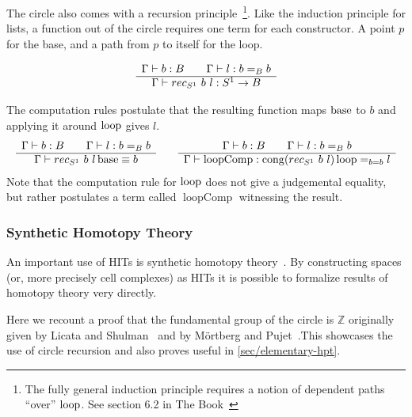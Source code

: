 The circle also comes with a recursion principle~\footnote{The fully general
  induction principle requires a notion of dependent paths ``over'' $\operatorname{loop}$. See section 6.2 in
  The Book~\cite{hottbook}}. Like the induction principle for lists,
a function out of the circle requires one term for each constructor. A point $p$
for the base, and a path from $p$ to itself for the loop.

\begin{equation*}
  \begin{array}[t]{c}
    \Gamma \vdash b : B \qquad \Gamma \vdash l : b =_B b\\
    \hline
    \Gamma \vdash rec_{S^1}~b~l : S^1 \rightarrow B
  \end{array}
\end{equation*}

The computation rules postulate that the resulting function maps $\operatorname{base}$ to $b$
and applying it around $\operatorname{loop}$ gives $l$.
\begin{equation*}
  \begin{array}[t]{c}
    \Gamma \vdash b : B \qquad \Gamma \vdash l : b =_B b\\
    \hline
    \Gamma \vdash rec_{S^1}~b~l \operatorname{base} \equiv b
  \end{array}
  \qquad
  \begin{array}[t]{c}
    \Gamma \vdash b : B \qquad \Gamma \vdash l : b =_B b\\
    \hline
    \Gamma \vdash \operatorname{loopComp} : \operatorname{cong} (rec_{S^1}~b~l) \operatorname{loop} =_{b=b} l
  \end{array}
\end{equation*}
Note that the computation rule for $\operatorname{loop}$ does not give a judgemental
equality, but rather postulates a term called $\operatorname{loopComp}$
witnessing the result.

\subsubsection{Synthetic Homotopy Theory}
An important use of HITs is synthetic homotopy theory~\cite{mortberg2020cubical,
  licata2015cubical}. By constructing spaces (or, more precisely cell
complexes) as HITs it is possible to formalize results of homotopy theory very
directly.

Here we recount a proof that the fundamental group of the circle is $\mathbb{Z}$
originally given by Licata and Shulman~\cite{licata2013circle} and by M\"ortberg
and Pujet~\cite{mortberg2020cubical}.This showcases the use of circle
recursion and also proves useful in \autoref{sec/elementary-hpt}.

